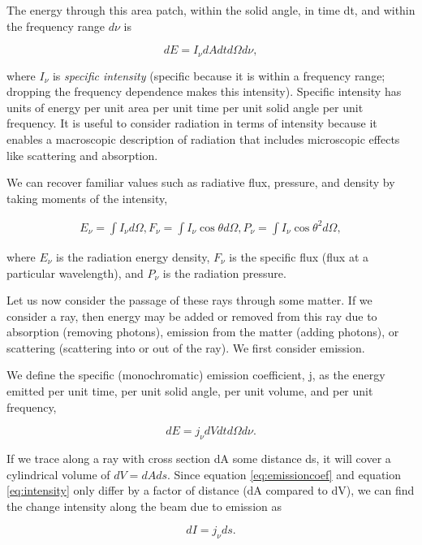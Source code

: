 The energy through this area patch, within the solid angle, in time dt, and within the frequency range $d\nu$ is

\begin{equation}
\label{eq:intensity}
dE = I_{\nu}dA dt d\Omega d\nu,
\end{equation}

where $I_{\nu}$ is \emph{specific intensity} (specific because it is within a frequency range; dropping the frequency dependence makes this intensity). Specific intensity has units of energy per unit area per unit time per unit solid angle per unit frequency. It is useful to consider radiation in terms of intensity because it enables a macroscopic description of radiation that includes microscopic effects like scattering and absorption.

We can recover familiar values such as radiative flux, pressure, and density by taking moments of the intensity,

\begin{align}
\label{eq:moments}
E_{\nu} = \int I_{\nu}d\Omega,
F_{\nu} = \int I_{\nu}\cos{\theta}d\Omega,
P_{\nu} = \int I_{\nu}\cos{\theta}^2d\Omega,
\end{align}

where $E_{\nu}$ is the radiation energy density, $F_{\nu}$ is the specific flux (flux at a particular wavelength), and $P_{\nu}$ is the radiation pressure.

Let us now consider the passage of these rays through some matter. If we consider a ray, then energy may be added or removed from this ray due to absorption (removing photons), emission from the matter (adding photons), or scattering (scattering into or out of the ray). We first consider emission.

We define the specific (monochromatic) emission coefficient, j, as the energy emitted per unit time, per unit solid angle, per unit volume, and per unit frequency,

\begin{equation}
\label{eq:emissioncoef}
dE = j_{\nu} dV dt d\Omega d\nu.
\end{equation}

If we trace along a ray with cross section dA some distance ds, it will cover a cylindrical volume of $dV = dA ds$. Since equation \ref{eq:emissioncoef} and equation \ref{eq:intensity} only differ by a factor of distance (dA compared to dV), we can find the change intensity along the beam due to emission as

\begin{equation}
\label{eq:emissionintensity}
dI = j_{\nu} ds.
\end{equation}

